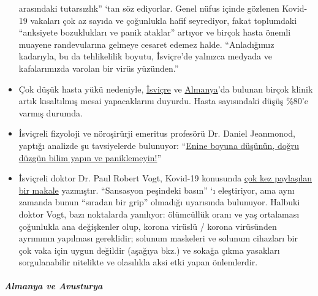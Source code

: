 \begin{itemize}
  arasındaki tutarsızlık'' `tan söz ediyorlar. Genel nüfus içinde
  gözlenen Kovid-19 vakaları çok az sayıda ve çoğunlukla hafif
  seyrediyor, fakat toplumdaki ``anksiyete bozuklukları ve panik
  ataklar'' artıyor ve birçok hasta önemli muayene randevularına gelmeye
  cesaret edemez halde. ``Anladığımız kadarıyla, bu da tehlikelilik
  boyutu, İsviçre'de yalnızca medyada ve kafalarımızda varolan bir virüs
  yüzünden.''
\item
  Çok düşük hasta yükü nedeniyle,
  \href{https://www.20min.ch/schweiz/news/story/Spitaeler-28949526}{İsviçre}
  ve
  \href{https://www.spiegel.de/wirtschaft/unternehmen/trotz-corona-pandemie-warum-kliniken-jetzt-kurzarbeit-anmelden-a-3dc61bc9-fb12-4298-8022-bb4c2be39d7d}{Almanya}'da
  bulunan birçok klinik artık kısaltılmış mesai yapacaklarını duyurdu.
  Hasta sayısındaki düşüş \%80'e varmış durumda.
\item
  İsviçreli fizyoloji ve nöroşirürji emeritus profesörü Dr. Daniel
  Jeanmonod, yaptığı analizde şu tavsiyelerde bulunuyor:
  ``\href{https://off-guardian.org/2020/04/07/think-deep-do-good-science-and-do-not-panic/}{Enine
  boyuna düşünün, doğru düzgün bilim yapın ve paniklemeyin!}''
\item
  İsviçreli doktor Dr. Paul Robert Vogt, Kovid-19 konusunda
  \href{https://www.mittellaendische.ch/2020/04/07/covid-19-eine-zwischenbilanz-oder-eine-analyse-der-moral-der-medizinischen-fakten-sowie-der-aktuellen-und-zuk\%C3\%BCnftigen-politischen-entscheidungen/}{çok
  kez paylaşılan bir makale} yazmıştır. ``Sansasyon peşindeki basın'' `ı
  eleştiriyor, ama aynı zamanda bunun ``sıradan bir grip'' olmadığı
  uyarısında bulunuyor. Halbuki doktor Vogt, bazı noktalarda yanılıyor:
  ölümcüllük oranı ve yaş ortalaması çoğunlukla ana değişkenler olup,
  korona virüslü / korona virüsünden ayrımının yapılması gereklidir;
  solunum maskeleri ve solunum cihazları bir çok vaka için uygun
  değildir (aşağıya bkz.) ve sokağa çıkma yasakları sorgulanabilir
  nitelikte ve olasılıkla aksi etki yapan önlemlerdir.
\end{itemize}

\hypertarget{almanya-ve-avusturya}{%
\subparagraph{\texorpdfstring{\textbf{Almanya ve
Avusturya}}{Almanya ve Avusturya}}\label{almanya-ve-avusturya}}


